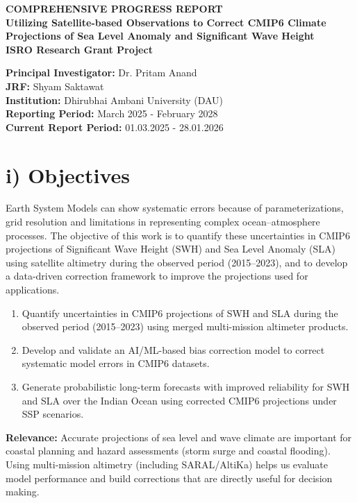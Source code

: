\documentclass[11pt,a4paper]{article}
\begin{document}
\appendix
\begin{center}
    \textbf{\LARGE COMPREHENSIVE PROGRESS REPORT} \\[1em]
    \textbf{\large Utilizing Satellite-based Observations to Correct CMIP6 Climate Projections of Sea Level Anomaly and Significant Wave Height} \\[1em]
    \textbf{ISRO Research Grant Project}
\end{center}

\vspace{1em}
\noindent \textbf{Principal Investigator:} Dr. Pritam Anand \\
\textbf{JRF:} Shyam Saktawat \\
\textbf{Institution:} Dhirubhai Ambani University (DAU) \\
\textbf{Reporting Period:} March 2025 - February 2028 \\
\textbf{Current Report Period:} 01.03.2025 - 28.01.2026

\section*{i) Objectives}
Earth System Models can show systematic errors because of parameterizations, grid resolution and limitations in representing complex ocean–atmosphere processes. The objective of this work is to quantify these uncertainties in CMIP6 projections of Significant Wave Height (SWH) and Sea Level Anomaly (SLA) using satellite altimetry during the observed period (2015--2023), and to develop a data-driven correction framework to improve the projections used for applications.

\begin{enumerate}[label=\alph*)]
    \item Quantify uncertainties in CMIP6 projections of SWH and SLA during the observed period (2015--2023) using merged multi-mission altimeter products.
    \item Develop and validate an AI/ML-based bias correction model to correct systematic model errors in CMIP6 datasets.
    \item Generate probabilistic long-term forecasts with improved reliability for SWH and SLA over the Indian Ocean using corrected CMIP6 projections under SSP scenarios.
\end{enumerate}

\noindent\textbf{Relevance:} Accurate projections of sea level and wave climate are important for coastal planning and hazard assessments (storm surge and coastal flooding). Using multi-mission altimetry (including SARAL/AltiKa) helps us evaluate model performance and build corrections that are directly useful for decision making.
\end{document}

